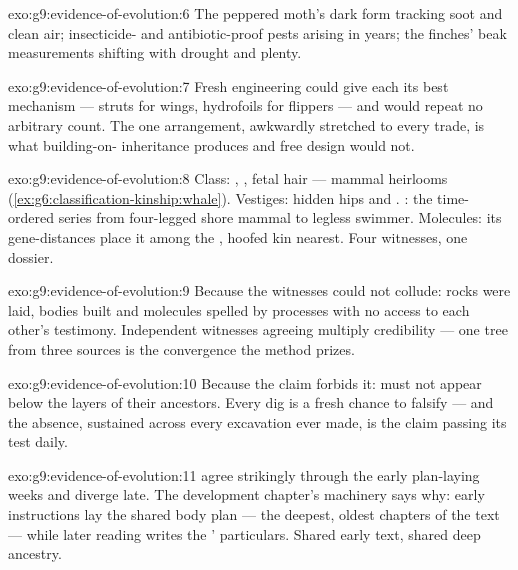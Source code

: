\begin{solution}{exo:g9:evidence-of-evolution:6}
The peppered moth's dark form tracking soot and clean air;
insecticide- and antibiotic-proof pests arising in years;
the finches' beak measurements shifting with drought and
plenty.
\end{solution}

\begin{solution}{exo:g9:evidence-of-evolution:7}
Fresh engineering could give each  its best mechanism
--- struts for wings, hydrofoils for flippers --- and
would repeat no arbitrary  count. The one arrangement,
awkwardly stretched to every trade, is what building-on-
inheritance produces and free design would not.
\end{solution}

\begin{solution}{exo:g9:evidence-of-evolution:8}
Class: , , fetal hair --- mammal
heirlooms (\cref{ex:g6:classification-kinship:whale}).
Vestiges: hidden hips and  . : the
time-ordered series from four-legged shore mammal to
legless swimmer. Molecules: its gene-distances place it
among the , hoofed kin nearest. Four witnesses, one
dossier.
\end{solution}

\begin{solution}{exo:g9:evidence-of-evolution:9}
Because the witnesses could not collude: rocks were laid,
bodies built and molecules spelled by processes with no
access to each other's testimony. Independent witnesses
agreeing multiply credibility --- one tree from three
sources is the convergence the method prizes.
\end{solution}

\begin{solution}{exo:g9:evidence-of-evolution:10}
Because the claim forbids it:  must not appear
below the layers of their ancestors. Every dig is a fresh
chance to falsify --- and the absence, sustained across
every excavation ever made, is the claim passing its test
daily.
\end{solution}

\begin{solution}{exo:g9:evidence-of-evolution:11}
  agree strikingly through the early
plan-laying weeks and diverge late. The development
chapter's machinery says why: early instructions lay the
shared body plan --- the deepest, oldest chapters of the
text --- while later reading writes the '
particulars. Shared early text, shared deep ancestry.
\end{solution}

